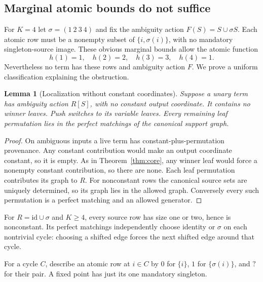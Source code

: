 \documentclass[11pt]{article}
\newtheorem{lemma}[theorem]{Lemma}
\begin{document}
\subsection{Marginal atomic bounds do not suffice}

For $K=4$ let $\sigma=(1\ 2\ 3\ 4)$ and fix the ambiguity action
$F(S)=S\cup\sigma S$. Each atomic row must be a nonempty subset of
$\{i,\sigma(i)\}$, with no mandatory singleton-source image. These
obvious marginal bounds allow the atomic function
\[
 h(1)=1,\quad h(2)=2,\quad h(3)=3,\quad h(4)=1.
\]
Nevertheless no term has these rows and ambiguity action $F$.
We prove a uniform classification explaining the obstruction.

\begin{lemma}[Localization without constant coordinates]\label{lem:local}
Suppose a unary term has ambiguity action $R[S]$, with no constant
output coordinate. It contains no winner leaves. Push switches to its
variable leaves.
Every remaining leaf permutation lies in the perfect matchings of the
canonical support graph.
\end{lemma}
\begin{proof}
On ambiguous inputs a live term has constant-plus-permutation provenance.
Any constant contribution would make an output coordinate constant,
so it is empty. As in Theorem~\ref{thm:core}, any winner leaf would force
a nonempty constant contribution, so there are none. Each leaf
permutation contributes its graph to $R$. For nonconstant rows the
canonical source sets are uniquely determined, so its graph lies in
the allowed graph. Conversely every such permutation is a perfect
matching and an allowed generator.
\end{proof}

For $R=\mathrm{id}\cup\sigma$ and $K\geq4$, every source row has size
one or two, hence is nonconstant. Its perfect matchings independently
choose identity or $\sigma$ on each nontrivial cycle: choosing a shifted
edge forces the next shifted edge around that cycle.

For a cycle $C$, describe an atomic row at $i\in C$ by
$0$ for $\{i\}$, $1$ for $\{\sigma(i)\}$, and $?$ for their pair.
A fixed point has just its one mandatory singleton.
\end{document}
